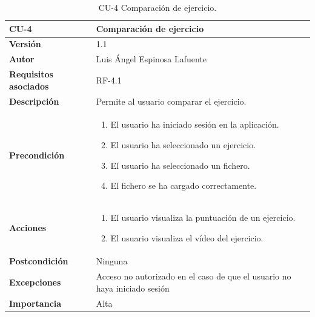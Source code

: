 \begin{table}[p]
	\centering
	\begin{tabularx}{\linewidth}{ p{} p{} }
		\toprule
		\textbf{CU-4}    & \textbf{Comparación de ejercicio}\\
		\toprule
		\textbf{Versión}              & 1.1    \\
		\textbf{Autor}                &  Luis Ángel Espinosa Lafuente \\
		\textbf{Requisitos asociados} & RF-4.1 \\
		\textbf{Descripción}          & Permite al usuario comparar el ejercicio.\\
		\textbf{Precondición}     &    
		\begin{enumerate}		
			\def\labelenumi{\arabic{enumi}.}
			\tightlist
			\item El usuario ha iniciado sesión en la aplicación.
			\item El usuario ha seleccionado un ejercicio.
			\item El usuario ha seleccionado un fichero.
			\item El fichero se ha cargado correctamente.
		\end{enumerate}\\
		\textbf{Acciones}             &
		\begin{enumerate}
			\def\labelenumi{\arabic{enumi}.}
			\tightlist
			\item El usuario visualiza la puntuación de un ejercicio.
			\item El usuario visualiza el vídeo del ejercicio.
		\end{enumerate}\\
		\textbf{Postcondición}        & Ninguna \\
		\textbf{Excepciones}          & Acceso no autorizado en el caso de que el usuario no haya iniciado sesión \\
		\textbf{Importancia}          & Alta \\
		\bottomrule
	\end{tabularx}
	\caption{CU-4 Comparación de ejercicio.}
\end{table}

